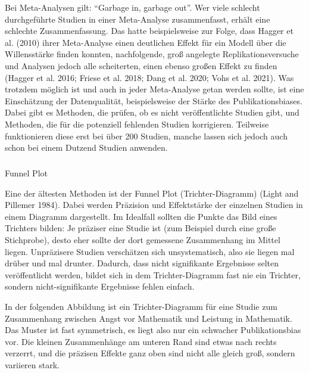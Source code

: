\documentclass[
  letterpaper,
  DIV=11,
  numbers=noendperiod]{scrreprt}
\makeatletter
\let\oldsubparagraph\subparagraph
\renewcommand{\subparagraph}{
    \@ifstar
      \xxxSubParagraphStar
      \xxxSubParagraphNoStar
  }
\newcommand{\xxxSubParagraphStar}[1]{\oldsubparagraph*{#1}\mbox{}}
\newcommand{\xxxSubParagraphNoStar}[1]{\oldsubparagraph{#1}\mbox{}}
\newenvironment{Shaded}{\begin{snugshade}}{\end{snugshade}}
\newcommand{\AttributeTok}[1]{\textcolor[rgb]{0.40,0.45,0.13}{#1}}
\newcommand{\CommentTok}[1]{\textcolor[rgb]{0.37,0.37,0.37}{#1}}
\newcommand{\DecValTok}[1]{\textcolor[rgb]{0.68,0.00,0.00}{#1}}
\newcommand{\FunctionTok}[1]{\textcolor[rgb]{0.28,0.35,0.67}{#1}}
\newcommand{\NormalTok}[1]{\textcolor[rgb]{0.00,0.23,0.31}{#1}}
\newcommand{\OtherTok}[1]{\textcolor[rgb]{0.00,0.23,0.31}{#1}}
\newcommand{\SpecialCharTok}[1]{\textcolor[rgb]{0.37,0.37,0.37}{#1}}
\newcommand{\StringTok}[1]{\textcolor[rgb]{0.13,0.47,0.30}{#1}}
\makeatother
\begin{document}
Bei Meta-Analysen gilt: ``Garbage in, garbage out''. Wer viele schlecht
durchgeführte Studien in einer Meta-Analyse zusammenfasst, erhält eine
schlechte Zusammenfassung. Das hatte beispielsweise zur Folge, dass
Hagger et al. (2010) ihrer Meta-Analyse einen deutlichen Effekt für ein
Modell über die Willensstärke finden konnten, nachfolgende, groß
angelegte Replikationsversuche und Analysen jedoch alle scheiterten,
einen ebenso großen Effekt zu finden (Hagger et al. 2016; Friese et al.
2018; Dang et al. 2020; Vohs et al. 2021). Was trotzdem möglich ist und
auch in jeder Meta-Analyse getan werden sollte, ist eine Einschätzung
der Datenqualität, beispielsweise der Stärke des Publikationsbiases.
Dabei gibt es Methoden, die prüfen, ob es nicht veröffentlichte Studien
gibt, und Methoden, die für die potenziell fehlenden Studien
korrigieren. Teilweise funktionieren diese erst bei über 200 Studien,
manche lassen sich jedoch auch schon bei einem Dutzend Studien anwenden.

\subparagraph{Funnel Plot}\label{funnel-plot}

Eine der ältesten Methoden ist der Funnel Plot (Trichter-Diagramm)
(Light and Pillemer 1984). Dabei werden Präzision und Effektstärke der
einzelnen Studien in einem Diagramm dargestellt. Im Idealfall sollten
die Punkte das Bild eines Trichters bilden: Je präziser eine Studie ist
(zum Beispiel durch eine große Stichprobe), desto eher sollte der dort
gemessene Zusammenhang im Mittel liegen. Unpräzisere Studien verschätzen
sich unsystematisch, also sie liegen mal drüber und mal drunter.
Dadurch, dass nicht signifikante Ergebnisse selten veröffentlicht
werden, bildet sich in dem Trichter-Diagramm fast nie ein Trichter,
sondern nicht-signifikante Ergebnisse fehlen einfach.

In der folgenden Abbildung ist ein Trichter-Diagramm für eine Studie zum
Zusammenhang zwischen Angst vor Mathematik und Leistung in Mathematik.
Das Muster ist fast symmetrisch, es liegt also nur ein schwacher
Publikationsbias vor. Die kleinen Zusammenhänge am unteren Rand sind
etwas nach rechts verzerrt, und die präzisen Effekte ganz oben sind
nicht alle gleich groß, sondern variieren stark.

\begin{Shaded}
\end{Shaded}
\end{document}
